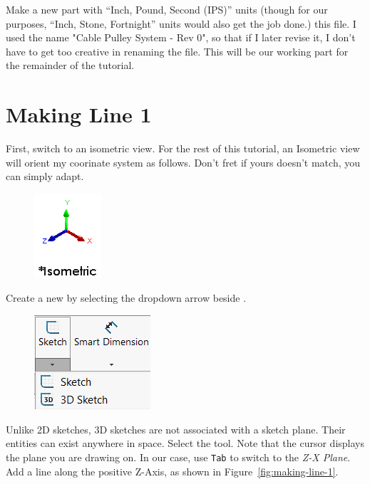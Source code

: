 Make a new part with ``Inch, Pound, Second (IPS)'' units (though for our purposes,
``Inch, Stone, Fortnight'' units would also get the job done.) 
this file. I used the name "Cable Pulley System - Rev 0", so that if I later
revise it, I don't have to get too creative in renaming the file. This
will be our working part for the remainder of the tutorial.

\section{Making Line 1}

\label{sec:making_line_1}

First, switch to an isometric view. For the rest of this tutorial, an Isometric
view will orient my coorinate system as follows. Don't fret if yours doesn't
match, you can simply adapt.

\begin{figure}[H]
\begin{center}
\includegraphics{images/figures/Coordinate-System.png}
\end{center}
\end{figure}

Create a new  by selecting the dropdown arrow beside
.

\begin{figure}[H]
\begin{center}
\includegraphics{images/symbols/3D-Sketch-Button.png}
\end{center}
\end{figure}

Unlike 2D sketches, 3D sketches are not associated with a sketch plane. Their entities
can exist anywhere in space. Select the  tool. Note that the cursor displays the plane you are drawing
on. In our case, use \texttt{Tab} to
switch to the \emph{Z-X Plane}. Add a line along
the positive Z-Axis, as shown in Figure~\ref{fig:making-line-1}.

